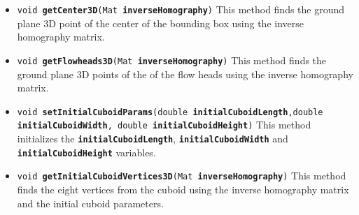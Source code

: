 \documentclass[a4paper]{aitthesis}
\begin{document}
\begin{itemize}
 \item \texttt{void \textbf{getCenter3D}(Mat \textbf{inverseHomography})} \newline
 This method finds the ground plane 3D point of the center of the bounding box using the inverse homography matrix.
 
 \item \texttt{void \textbf{getFlowheads3D}(Mat \textbf{inverseHomography})} This method finds the ground plane 3D points of the of the flow heads using the inverse homography matrix.
 
 \item \texttt{void \textbf{setInitialCuboidParams}(double \textbf{initialCuboidLength},\newline double \textbf{initialCuboidWidth}, double \textbf{initialCuboidHeight})} \newline
 This method initializes the \texttt{\textbf{initialCuboidLength}}, \texttt{\textbf{initialCuboidWidth}} and \newline \texttt{\textbf{initialCuboidHeight}} variables.
 
 \item \texttt{void \textbf{getInitialCuboidVertices3D}(Mat \textbf{inverseHomography})} \newline
 This method finds the eight vertices from the cuboid using the inverse homography matrix and the initial cuboid parameters.
 \end{itemize}
 
\end{document}
